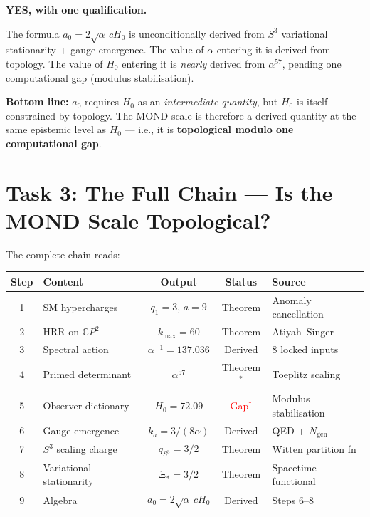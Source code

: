 \documentclass[12pt,a4paper]{article}
\newcommand{\CP}{\mathbb{C}P}
\newcommand{\Hzero}{H_0}
\begin{document}
\begin{tcolorbox}[colback=blue!5!white, colframe=blue!60!black,
  title=Verdict: Is $a_0$ Derived?]
\textbf{YES, with one qualification.}

The formula $a_0 = 2\sqrt{\alpha}\,c\Hzero$ is unconditionally derived from
$S^3$ variational stationarity + gauge emergence. The value of $\alpha$
entering it is derived from topology. The value of $\Hzero$ entering it is
\emph{nearly} derived from $\alpha^{57}$, pending one computational gap
(modulus stabilisation).

\medskip
\textbf{Bottom line:} $a_0$ requires $\Hzero$ as an \emph{intermediate
quantity}, but $\Hzero$ is itself constrained by topology. The MOND scale
is therefore a derived quantity at the same epistemic level as $\Hzero$ ---
i.e., it is \textbf{topological modulo one computational gap}.
\end{tcolorbox}


\section{Task 3: The Full Chain --- Is the MOND Scale Topological?}
\label{sec:chain}

The complete chain reads:

\begin{center}
\renewcommand{\arraystretch}{1.4}
\begin{tabular}{clccl}
\toprule
\textbf{Step} & \textbf{Content} & \textbf{Output} & \textbf{Status} & \textbf{Source} \\
\midrule
1 & SM hypercharges & $q_1 = 3$, $a = 9$ & Theorem & Anomaly cancellation \\
2 & HRR on $\CP^2$ & $k_{\max} = 60$ & Theorem & Atiyah--Singer \\
3 & Spectral action & $\alpha^{-1} = 137.036$ & Derived & 8 locked inputs \\
4 & Primed determinant & $\alpha^{57}$ & Theorem${}^*$ & Toeplitz scaling \\
5 & Observer dictionary & $\Hzero = 72.09$ & \textcolor{red}{Gap${}^\dagger$} & Modulus stabilisation \\
6 & Gauge emergence & $k_a = 3/(8\alpha)$ & Derived & QED + $N_{\mathrm{gen}}$ \\
7 & $S^3$ scaling charge & $q_{S^3} = 3/2$ & Theorem & Witten partition fn \\
8 & Variational stationarity & $\Xi_* = 3/2$ & Theorem & Spacetime functional \\
9 & Algebra & $a_0 = 2\sqrt{\alpha}\,c\Hzero$ & Derived & Steps 6--8 \\
\bottomrule
\end{tabular}
\end{center}
\end{document}
